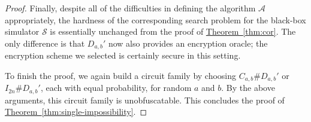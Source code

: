 \documentclass[11pt]{article}
\numberwithin{equation}{section}
\newcommand{\expref}[2]{\texorpdfstring{\hyperref[#2]{#1~\ref{#2}}}{#1~\ref{#2}}}
\newcommand{\algo}{\mathcal}
\begin{document}
{\begin{proof}
Finally, despite all of the difficulties in defining the algorithm $\algo A$ appropriately, the hardness of the corresponding search problem for the black-box simulator $\algo S$ is essentially unchanged from the proof of \expref{Theorem}{thm:cor}. The only difference is that $D_{a, b}'$ now also provides an encryption oracle; the encryption scheme we selected is certainly secure in this setting. 

To finish the proof, we again build a circuit family by choosing $C_{a, b} \# D_{a, b}'$ or $I_{2n} \# D_{a, b}'$, each with equal probability, for random $a$ and $b$. By the above arguments, this circuit family is unobfuscatable. This concludes the proof of \expref{Theorem}{thm:single-impossibility}.
\end{proof}



%
%
%


}
\end{document}
